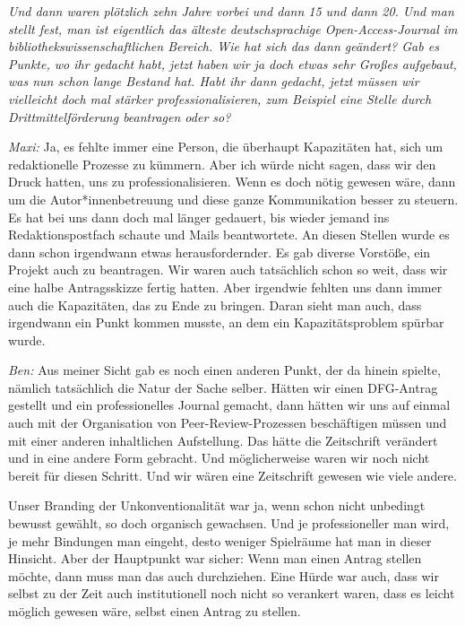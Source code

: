 \documentclass[a4paper,
fontsize=11pt,
oneside,
numbers=noperiodatend,
parskip=half-,
bibliography=totoc,
final
]{scrartcl}
\begin{document}
\emph{Und dann waren plötzlich zehn Jahre vorbei und dann 15 und dann
20. Und man stellt fest, man ist eigentlich das älteste deutschsprachige
Open-Access-Journal im bibliothekswissenschaftlichen Bereich. Wie hat
sich das dann geändert? Gab es Punkte, wo ihr gedacht habt, jetzt haben
wir ja doch etwas sehr Großes aufgebaut, was nun schon lange Bestand
hat. Habt ihr dann gedacht, jetzt müssen wir vielleicht doch mal stärker
professionalisieren, zum Beispiel eine Stelle durch Drittmittelförderung
beantragen oder so?}

\emph{Maxi:} Ja, es fehlte immer eine Person, die überhaupt Kapazitäten
hat, sich um redaktionelle Prozesse zu kümmern. Aber ich würde nicht
sagen, dass wir den Druck hatten, uns zu professionalisieren. Wenn es
doch nötig gewesen wäre, dann um die Autor*innenbetreuung und diese
ganze Kommunikation besser zu steuern. Es hat bei uns dann doch mal
länger gedauert, bis wieder jemand ins Redaktionspostfach schaute und
Mails beantwortete. An diesen Stellen wurde es dann schon irgendwann
etwas herausfordernder. Es gab diverse Vorstöße, ein Projekt auch zu
beantragen. Wir waren auch tatsächlich schon so weit, dass wir eine
halbe Antragsskizze fertig hatten. Aber irgendwie fehlten uns dann immer
auch die Kapazitäten, das zu Ende zu bringen. Daran sieht man auch, dass
irgendwann ein Punkt kommen musste, an dem ein Kapazitätsproblem spürbar
wurde.

\emph{Ben:} Aus meiner Sicht gab es noch einen anderen Punkt, der da
hinein spielte, nämlich tatsächlich die Natur der Sache selber. Hätten
wir einen DFG-Antrag gestellt und ein
\textquotesingle professionelles\textquotesingle{} Journal gemacht, dann
hätten wir uns auf einmal auch mit der Organisation von
Peer-Review-Prozessen beschäftigen müssen und mit einer anderen
inhaltlichen Aufstellung. Das hätte die Zeitschrift verändert und in
eine andere Form gebracht. Und möglicherweise waren wir noch nicht
bereit für diesen Schritt. Und wir wären eine Zeitschrift gewesen wie
viele andere.

Unser Branding der Unkonventionalität war ja, wenn schon nicht unbedingt
bewusst gewählt, so doch organisch gewachsen. Und je professioneller man
wird, je mehr Bindungen man eingeht, desto weniger Spielräume hat man in
dieser Hinsicht. Aber der Hauptpunkt war sicher: Wenn man einen Antrag
stellen möchte, dann muss man das auch durchziehen. Eine Hürde war auch,
dass wir selbst zu der Zeit auch institutionell noch nicht so verankert
waren, dass es leicht möglich gewesen wäre, selbst einen Antrag zu
stellen.
\end{document}
